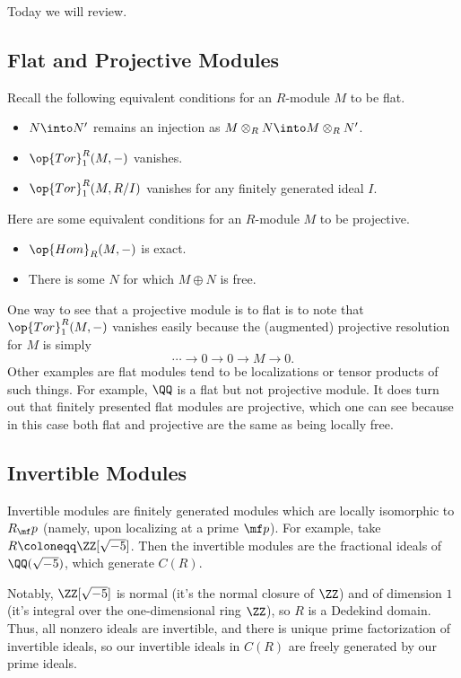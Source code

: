 \documentclass[../notes.tex]{subfiles}
\begin{document}

Today we will review.

\subsection{Flat and Projective Modules}
Recall the following equivalent conditions for an $R$-module $M$ to be flat.
\begin{itemize}
	\item $N\into N'$ remains an injection as $M\otimes_RN\into M\otimes_RN'$.
	\item $\op{Tor}_1^R(M,-)$ vanishes.
	\item $\op{Tor}_1^R(M,R/I)$ vanishes for any finitely generated ideal $I$.
\end{itemize}
Here are some equivalent conditions for an $R$-module $M$ to be projective.
\begin{itemize}
	\item $\op{Hom}_R(M,-)$ is exact.
	\item There is some $N$ for which $M\oplus N$ is free.
\end{itemize}
One way to see that a projective module is to flat is to note that $\op{Tor}_1^R(M,-)$ vanishes easily because the (augmented) projective resolution for $M$ is simply
\[\cdots\to0\to0\to M\to0.\]
Other examples are flat modules tend to be localizations or tensor products of such things. For example, $\QQ$ is a flat but not projective module. It does turn out that finitely presented flat modules are projective, which one can see because in this case both flat and projective are the same as being locally free.

\subsection{Invertible Modules}
Invertible modules are finitely generated modules which are locally isomorphic to $R_\mf p$ (namely, upon localizing at a prime $\mf p$). For example, take $R\coloneqq\ZZ[\sqrt{-5}]$. Then the invertible modules are the fractional ideals of $\QQ(\sqrt{-5})$, which generate $C(R)$.

Notably, $\ZZ[\sqrt{-5}]$ is normal (it's the normal closure of $\ZZ$) and of dimension $1$ (it's integral over the one-dimensional ring $\ZZ$), so $R$ is a Dedekind domain. Thus, all nonzero ideals are invertible, and there is unique prime factorization of invertible ideals, so our invertible ideals in $C(R)$ are freely generated by our prime ideals.
\end{document}
